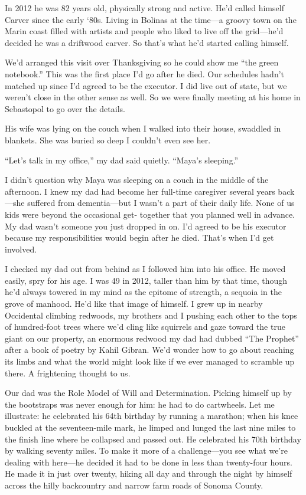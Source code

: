 \documentclass[12pt]{book}
\begin{document}
In 2012 he was 82 years old, physically strong and active. He'd called himself Carver since the early `80s. Living in Bolinas at the time---a groovy town on the Marin coast filled with artists and people who liked to live off the grid---he'd decided he was a driftwood carver. So that's what he'd started calling himself.

We'd arranged this visit over Thanksgiving so he could show me ``the green notebook.'' This was the first place I'd go after he died. Our schedules hadn't matched up since I'd agreed to be the executor. I did live out of state, but we weren't close in the other sense as well. So we were finally meeting at his home in Sebastopol to go over the details.

His wife was lying on the couch when I walked into their house, swaddled in blankets. She was buried so deep I couldn't even see her.

``Let's talk in my office,'' my dad said quietly. ``Maya's sleeping.''

I didn't question why Maya was sleeping on a couch in the middle of the afternoon. I knew my dad had become her full-time caregiver several years back---she suffered from dementia---but I wasn't a part of their daily life. None of us kids were beyond the occasional get- together that you planned well in advance. My dad wasn't someone you just dropped in on. I'd agreed to be his executor because my responsibilities would begin after he died. That's when I'd get involved.

I checked my dad out from behind as I followed him into his office. He moved easily, spry for his age. I was 49 in 2012, taller than him by that time, though he'd always towered in my mind as the epitome of strength, a sequoia in the grove of manhood. He'd like that image of himself. I grew up in nearby Occidental climbing redwoods, my brothers and I pushing each other to the tops of hundred-foot trees where we'd cling like squirrels and gaze toward the true giant on our property, an enormous redwood my dad had dubbed ``The Prophet'' after a book of poetry by Kahil Gibran. We'd wonder how to go about reaching its limbs and what the world might look like if we ever managed to scramble up there. A frightening thought to us.

Our dad was the Role Model of Will and Determination. Picking himself up by the bootstraps was never enough for him: he had to do cartwheels. Let me illustrate: he celebrated his 64th birthday by running a marathon; when his knee buckled at the seventeen-mile mark, he limped and lunged the last nine miles to the finish line where he collapsed and passed out. He celebrated his 70th birthday by walking seventy miles. To make it more of a challenge---you see what we're dealing with here---he decided it had to be done in less than twenty-four hours. He made it in just over twenty, hiking all day and through the night by himself across the hilly backcountry and narrow farm roads of Sonoma County.
\end{document}
